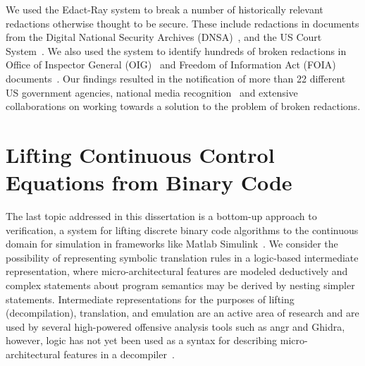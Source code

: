 We used the Edact-Ray system to break a number of historically relevant redactions otherwise thought to be secure.
These include redactions in documents from the Digital National Security Archives (DNSA)~\cite{dnsaSite}, and the US Court System~\cite{pacerSite}.
We also used the system to identify hundreds of broken redactions in Office of Inspector General (OIG)~\cite{oigReports} and Freedom of Information Act (FOIA) documents~\cite{govattic}.
Our findings resulted in the notification of more than 22 different US government agencies, national media recognition~\cite{wired} and extensive collaborations on working towards a solution to the problem of broken redactions.

\section{Lifting Continuous Control Equations from Binary Code}

The last topic addressed in this dissertation is a bottom-up approach to verification, a 
system for lifting discrete binary code algorithms to the continuous domain for simulation
in frameworks like Matlab Simulink~\cite{bland2023integreat, matlab}.
We consider the possibility of representing symbolic translation rules in a logic-based intermediate representation, where micro-architectural features are modeled deductively and complex statements about program semantics may be derived by nesting simpler statements.
Intermediate representations for the purposes of lifting (decompilation), translation, and emulation are an active area of research and are used by several high-powered offensive analysis tools such as angr and Ghidra, however, logic has not yet been used as a syntax for describing micro-architectural features in a decompiler~\cite{lattner2021mlir, quinlan2000rose, chen2022metaemu, eagle2020ghidra, kim2017testing, stanier2013intermediate}.

